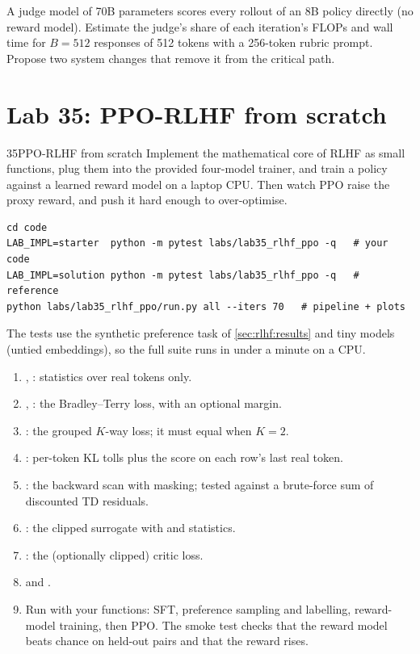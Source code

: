 \begin{exercise}
A judge model of 70B parameters scores every rollout of an 8B policy directly (no reward model).
Estimate the judge's share of each iteration's FLOPs and wall time for $B=512$ responses of 512 tokens with a
256-token rubric prompt. Propose two system changes that remove it from the critical path.
\end{exercise}

\section{Lab 35: PPO-RLHF from scratch}\label{sec:rlhf:lab}

\begin{labbox}{35}{PPO-RLHF from scratch}
Implement the mathematical core of RLHF as small functions, plug them into the provided four-model trainer,
and train a policy against a learned reward model on a laptop CPU. Then watch PPO raise the proxy
reward, and push it hard enough to over-optimise.

\begin{lstlisting}[style=shell]
cd code
LAB_IMPL=starter  python -m pytest labs/lab35_rlhf_ppo -q   # your code
LAB_IMPL=solution python -m pytest labs/lab35_rlhf_ppo -q   # reference
python labs/lab35_rlhf_ppo/run.py all --iters 70   # pipeline + plots
\end{lstlisting}
The tests use the synthetic preference task of \cref{sec:rlhf:results} and tiny models (untied
embeddings), so the full suite runs in under a minute on a CPU.

\begin{enumerate}
  \item {}, : statistics over real tokens only.
  \item {}, : the Bradley--Terry loss, with an optional margin.
  \item {}: the grouped $K$-way loss; it must equal  when $K=2$.
  \item {}: per-token KL tolls plus the score on each row's last real token.
  \item {}: the backward scan with masking; tested against a brute-force sum of discounted TD residuals.
  \item {}: the clipped surrogate with  and  statistics.
  \item {}: the (optionally clipped) critic loss.
  \item {} and .
  \item Run  with your functions: SFT, preference sampling and labelling, reward-model
        training, then PPO. The smoke test checks that the reward model beats chance on held-out pairs and
        that the reward rises.
\end{enumerate}


\end{labbox}
